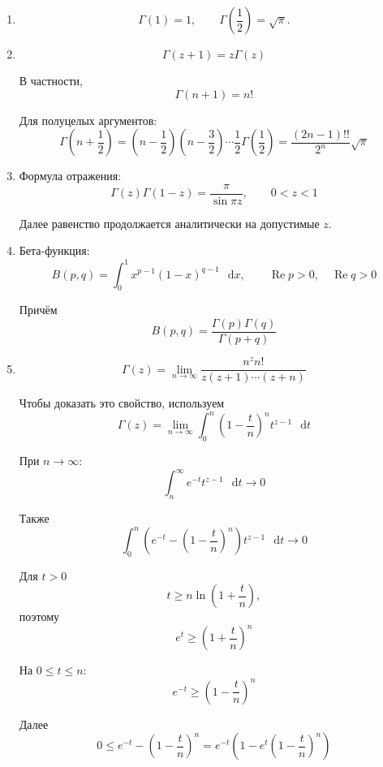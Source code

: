 \documentclass[11pt,a4paper]{report}
\numberwithin{equation}{section}
\numberwithin{figure}{chapter}
\numberwithin{table}{chapter}
\newcommand{\dd}{\mathop{}\!\mathrm{d}}
\begin{document}
\begin{enumerate}
    \item
    \[
    \Gamma(1)=1,
    \qquad
    \Gamma\left(\frac12\right)=\sqrt\pi.
    \]

    \item
    \[
    \Gamma(z+1)=z\Gamma(z)
    \]

    В частности,
    \[
    \Gamma(n+1)=n!
    \]

    Для полуцелых аргументов:
    \[
    \Gamma\left(n+\frac12\right)
    =
    \left(n-\frac12\right)
    \left(n-\frac32\right)
    \cdots
    \frac12
    \Gamma\left(\frac12\right)
    =
    \frac{(2n-1)!!}{2^n}\sqrt\pi
    \]

    \item Формула отражения:
    \[
    \boxed{
    \Gamma(z)\Gamma(1-z)
    =
    \frac{\pi}{\sin\pi z},
    \qquad
    0<z<1
    }
    \]

    Далее равенство продолжается аналитически на допустимые $z$.

    \item Бета-функция:
    \[
    B(p,q)
    =
    \int_0^1
    x^{p-1}(1-x)^{q-1}\,\dd x,
    \qquad
    \operatorname{Re}p>0,
    \quad
    \operatorname{Re}q>0
    \]

    Причём
    \[
    B(p,q)
    =
    \frac{\Gamma(p)\Gamma(q)}
    {\Gamma(p+q)}
    \]

    \item
    \[
    \Gamma(z)
    =
    \lim_{n\to\infty}
    \frac{n^z n!}
    {z(z+1)\cdots(z+n)}
    \]

    Чтобы доказать это свойство, используем
    \[
    \Gamma(z)
    =
    \lim_{n\to\infty}
    \int_0^n
    \left(1-\frac{t}{n}\right)^n
    t^{z-1}\,\dd t
    \]

    При $n\to\infty$:
    \[
    \int_n^\infty
    e^{-t}t^{z-1}\,\dd t
    \longrightarrow0
    \]

    Также
    \[
    \int_0^n
    \left(
    e^{-t}
    -
    \left(1-\frac{t}{n}\right)^n
    \right)
    t^{z-1}\,\dd t
    \longrightarrow0
    \]

    Для $t>0$
    \[
    t
    \ge
    n\ln\left(1+\frac{t}{n}\right),
    \]
    поэтому
    \[
    e^t
    \ge
    \left(1+\frac{t}{n}\right)^n
    \]

    На $0\le t\le n$:
    \[
    e^{-t}
    \ge
    \left(1-\frac{t}{n}\right)^n
    \]

    Далее
    \[
    0
    \le
    e^{-t}
    -
    \left(1-\frac{t}{n}\right)^n
    =
    e^{-t}
    \left(
    1-e^t\left(1-\frac{t}{n}\right)^n
    \right)
    \]


\end{enumerate}
\end{document}

